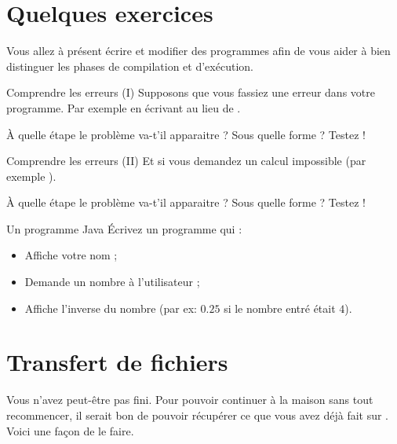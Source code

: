 \documentclass[a4paper,11pt]{style-esi/td}
\begin{document}
\section{Quelques exercices}  

	Vous allez à présent écrire et modifier des programmes
	afin de vous aider à bien distinguer les phases de compilation et d'exécution. 

	\begin{Exercice}{Comprendre les erreurs (I)}
		Supposons que vous fassiez une erreur dans votre programme.
		Par exemple en écrivant  
		au lieu de .

		À quelle étape le problème va-t'il apparaitre ?
		Sous quelle forme ? Testez !
	\end{Exercice}

	\begin{Exercice}{Comprendre les erreurs (II)}
		Et si vous demandez un calcul impossible (par exemple ).

		À quelle étape le problème va-t'il apparaitre ?
		Sous quelle forme ? Testez !
	\end{Exercice}

	\begin{Exercice}{Un programme Java}
		Écrivez un programme qui :
		\begin{itemize}
		\item Affiche votre nom ;
		\item Demande un nombre à l'utilisateur ;
		\item Affiche l'inverse du nombre (par ex: $0.25$ si le nombre entré était $4$).
		\end{itemize}
	\end{Exercice}

\section{Transfert de fichiers}  

	Vous n'avez peut-être pas fini. Pour pouvoir continuer à la maison sans 
	tout re\-com\-men\-cer, 
    il serait bon de pouvoir récupérer ce que vous avez déjà fait sur .
	Voici une façon de le faire.			
				
\end{document}
